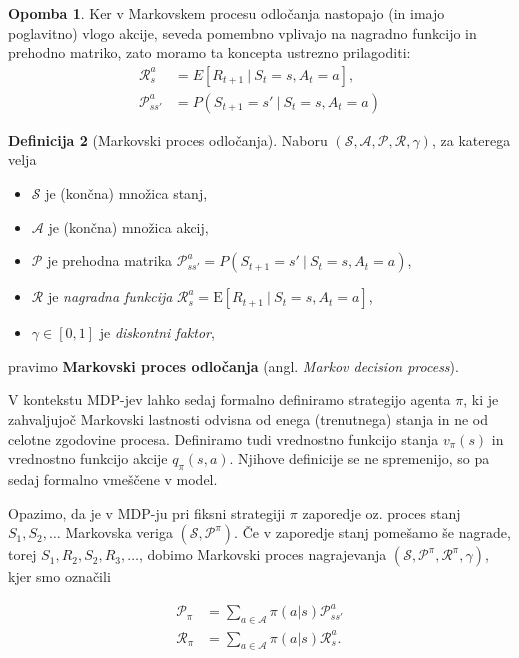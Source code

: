 \documentclass[12pt,a4paper]{amsart}
\theoremstyle{definition} %
\newtheorem{definicija}{Definicija}[section]
\newtheorem{opomba}[definicija]{Opomba}
\theoremstyle{plain} %
\begin{document}
\begin{opomba}
    Ker v Markovskem procesu odločanja nastopajo (in imajo poglavitno) vlogo akcije, seveda pomembno 
    vplivajo na nagradno funkcijo in prehodno matriko, zato moramo ta koncepta ustrezno prilagoditi:
    \begin{align*}
    \mathcal{R}_s^a &= E[R_{t+1}~|~S_{t} = s, A_t = a], \\
    \mathcal{P}_{ss'}^a &= P(S_{t+1} = s'~|~S_t = s, A_t = a)
    \end{align*}
\end{opomba}

\begin{definicija}[Markovski proces odločanja]
    Naboru $(\mathcal{S}, \mathcal{A}, \mathcal{P}, \mathcal{R}, \gamma)$, za katerega velja
    \begin{itemize}
        \item $\mathcal{S}$ je (končna) množica stanj,
        \item $\mathcal{A}$ je (končna) množica akcij, 
        \item $\mathcal{P}$ je prehodna matrika $\mathcal{P}_{ss'}^a = P(S_{t+1} = s'~|~
                S_t = s, A_t = a)$, 
        \item $\mathcal{R}$ je \textit{nagradna funkcija} 
                $\mathcal{R}_s^a = \mathrm{E}[R_{t+1}~|~S_{t} = s, A_t = a]$, 
        \item $\gamma \in [0,1]$ je \textit{diskontni faktor}, 
    \end{itemize}
    pravimo \textbf{Markovski proces odločanja} (angl. \textit{Markov decision process}).
\end{definicija}

V kontekstu MDP-jev lahko sedaj formalno definiramo strategijo agenta $\pi$, ki je zahvaljujoč 
Markovski lastnosti odvisna od enega (trenutnega) stanja in ne od celotne zgodovine procesa. 
Definiramo tudi vrednostno funkcijo stanja $v_{\pi}(s)$ in vrednostno funkcijo akcije $q_{\pi}(s, a)$. 
Njihove definicije se ne spremenijo, so pa sedaj formalno vmeščene v model.

Opazimo, da je v MDP-ju pri fiksni strategiji $\pi$ zaporedje oz. proces stanj $S_1, S_2, \dots$ 
Markovska veriga $(\mathcal{S}, \mathcal{P}^\pi)$. Če v zaporedje stanj pomešamo še nagrade, 
torej $S_1, R_2, S_2, R_3, \dots$, dobimo Markovski proces nagrajevanja $(\mathcal{S}, 
\mathcal{P}^\pi, \mathcal{R}^\pi, \gamma)$, kjer smo označili

\begin{align*}
    \mathcal{P}_\pi &= \sum_{a \in \mathcal{A}} \pi(a|s) \mathcal{P}_{ss'}^a \\
    \mathcal{R}_\pi &= \sum_{a \in \mathcal{A}} \pi(a|s) \mathcal{R}_{s}^a. 
    \end{align*}
\end{document}

